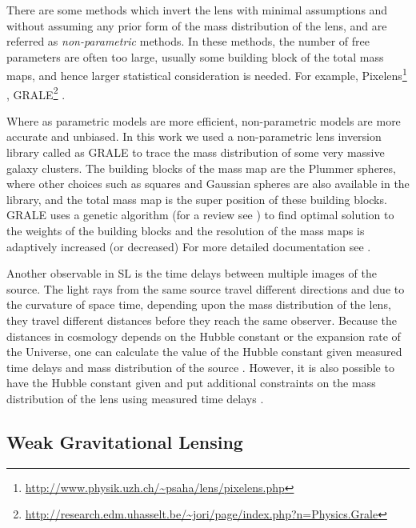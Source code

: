 \documentclass[
  11pt,
  twoside,
  openright,
  titlepage,
  headings=optiontoheadandtoc
]{scrbook}
\begin{document}
There are some methods which invert the lens with minimal assumptions and without
assuming any prior form of the mass distribution of the lens, and are referred as
{\it non-parametric} methods. In these methods, the number of free parameters are often
too large, usually some building block of the total mass maps, and hence larger
statistical consideration is needed. For example, 
Pixelens\footnote{\url{http://www.physik.uzh.ch/~psaha/lens/pixelens.php}} 
\cite{2011ascl.soft02007S}, 
GRALE\footnote{\url{http://research.edm.uhasselt.be/~jori/page/index.php?n=Physics.Grale}}
\cite{2006MNRAS.367.1209L}.

Where as parametric models are more efficient, non-parametric models are more
accurate and unbiased. In this work we used a non-parametric lens inversion
library called as GRALE \cite{2006MNRAS.367.1209L,2007MNRAS.380.1729L,2009MNRAS.397..341L} 
to trace the mass distribution of some very massive
galaxy clusters. The building blocks of the mass map are the Plummer spheres, where
other choices such as squares and Gaussian spheres are also available in the library, 
and the total mass map is the super position of these building blocks. GRALE uses
a genetic algorithm (for a review see \citep{1995ApJS..101..309C}) 
to find optimal solution to the weights of the building 
blocks and the resolution of the mass maps is adaptively increased (or decreased)
For more detailed documentation see \cite{2009MNRAS.397..341L}.

Another observable in SL is the time delays between multiple images
of the source. The light rays from the same source travel different directions
and due to the curvature of space time, depending upon the mass distribution 
of the lens, they travel different distances before they reach the same 
observer. Because the distances in cosmology depends on the Hubble constant
or the expansion rate of the Universe, one can calculate the value of the
Hubble constant given measured time delays and mass distribution of the source
\cite{2004tomu.conf..231R}. 
However, it is also possible to have the Hubble constant given and put
additional constraints on the mass distribution of the lens using measured
time delays \cite{2015PASJ...67...21M}.


\subsection{Weak Gravitational Lensing}\label{sec:wl}
\end{document}
